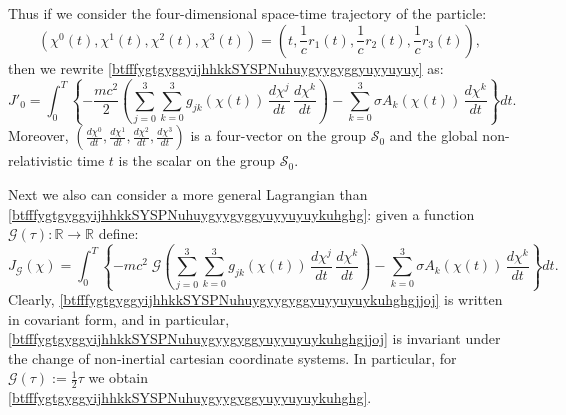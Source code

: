 \documentclass{article}
\theoremstyle{definition}
\theoremstyle{remark}
\newcommand{\er}{\eqref}
\newcommand{\er}{\eqref}
\begin{document}
Thus if we consider the four-dimensional space-time trajectory of
the particle:
\begin{equation}\label{btfffjhgjghgh}
\left(\chi^0(t),\chi^1(t),\chi^2(t),\chi^3(t)\right)=\left(t,\frac{1}{c}r_1(t),\frac{1}{c}r_2(t),\frac{1}{c}r_3(t)\right),
\end{equation}
then we rewrite \er{btfffygtgyggyijhhkkSYSPNuhuygyygyggyuyyuyuy} as:
\begin{equation}\label{btfffygtgyggyijhhkkSYSPNuhuygyygyggyuyyuyuykuhghg}
J'_0=
\int_0^T\left\{-\frac{mc^2}{2}\left(\sum_{j=0}^{3}\sum_{k=0}^{3}g_{jk}\left(\chi(t)\right)\,\frac{d\chi^j}{dt}\,\frac{d\chi^k}{dt}\right)-\sum_{k=0}^{3}\sigma
A_k\left(\chi(t)\right)\,\frac{d\chi^k}{dt}\right\}dt.
\end{equation}
Moreover, $\left(\frac{d\chi^0}{dt}, \frac{d\chi^1}{dt},
\frac{d\chi^2}{dt}, \frac{d\chi^3}{dt}\right)$ is a four-vector on
the group $\mathcal{S}_0$ and the global non-relativistic time $t$
is the scalar on the group $\mathcal{S}_0$.


Next we also can consider a more general Lagrangian than
\er{btfffygtgyggyijhhkkSYSPNuhuygyygyggyuyyuyuykuhghg}: given a
function $\mathcal{G}(\tau):\mathbb{R}\to\mathbb{R}$ define:
\begin{equation}\label{btfffygtgyggyijhhkkSYSPNuhuygyygyggyuyyuyuykuhghgjjoj}
J_{\mathcal{G}}(\chi)=
\int_0^T\left\{-mc^2\;\mathcal{G}\left(\sum_{j=0}^{3}\sum_{k=0}^{3}g_{jk}\left(\chi(t)\right)\,\frac{d\chi^j}{dt}\,\frac{d\chi^k}{dt}\right)-\sum_{k=0}^{3}\sigma
A_k\left(\chi(t)\right)\,\frac{d\chi^k}{dt}\right\}dt.
\end{equation}
Clearly, \er{btfffygtgyggyijhhkkSYSPNuhuygyygyggyuyyuyuykuhghgjjoj}
is written in covariant form, and in particular,
\er{btfffygtgyggyijhhkkSYSPNuhuygyygyggyuyyuyuykuhghgjjoj} is
invariant under the change of non-inertial cartesian coordinate
systems. In particular, for $\mathcal{G}(\tau):=\frac{1}{2}\tau$ we
obtain \er{btfffygtgyggyijhhkkSYSPNuhuygyygyggyuyyuyuykuhghg}.
\end{document}
